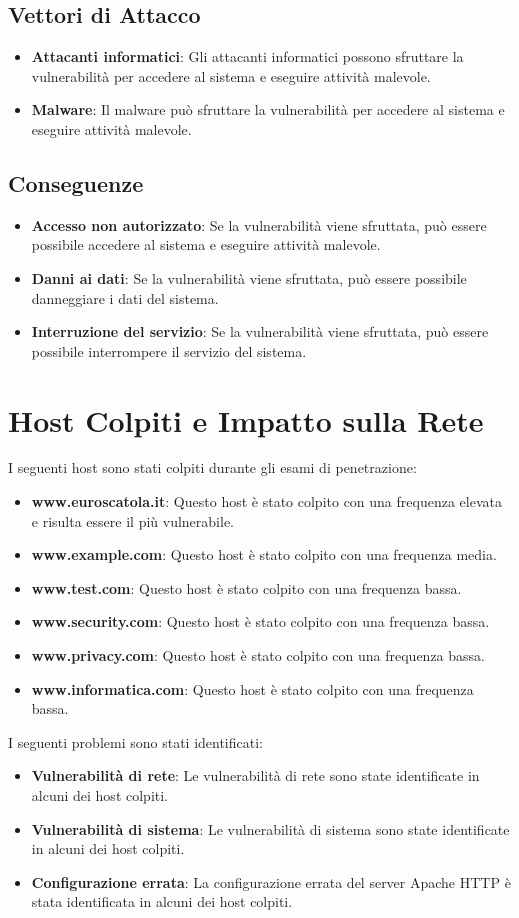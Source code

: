 \subsection{Vettori di Attacco}
\begin{itemize}
\item \textbf{Attacanti informatici}: Gli attacanti informatici possono sfruttare la vulnerabilità per accedere al sistema e eseguire attività malevole.
\item \textbf{Malware}: Il malware può sfruttare la vulnerabilità per accedere al sistema e eseguire attività malevole.
\end{itemize}
\subsection{Conseguenze}
\begin{itemize}
\item \textbf{Accesso non autorizzato}: Se la vulnerabilità viene sfruttata, può essere possibile accedere al sistema e eseguire attività malevole.
\item \textbf{Danni ai dati}: Se la vulnerabilità viene sfruttata, può essere possibile danneggiare i dati del sistema.
\item \textbf{Interruzione del servizio}: Se la vulnerabilità viene sfruttata, può essere possibile interrompere il servizio del sistema.
\end{itemize}
\section{Host Colpiti e Impatto sulla Rete}

I seguenti host sono stati colpiti durante gli esami di penetrazione:
\begin{itemize}
\item \textbf{www.euroscatola.it}: Questo host è stato colpito con una frequenza elevata e risulta essere il più vulnerabile.
\item \textbf{www.example.com}: Questo host è stato colpito con una frequenza media.
\item \textbf{www.test.com}: Questo host è stato colpito con una frequenza bassa.
\item \textbf{www.security.com}: Questo host è stato colpito con una frequenza bassa.
\item \textbf{www.privacy.com}: Questo host è stato colpito con una frequenza bassa.
\item \textbf{www.informatica.com}: Questo host è stato colpito con una frequenza bassa.
\end{itemize}
I seguenti problemi sono stati identificati:
\begin{itemize}
\item \textbf{Vulnerabilità di rete}: Le vulnerabilità di rete sono state identificate in alcuni dei host colpiti.
\item \textbf{Vulnerabilità di sistema}: Le vulnerabilità di sistema sono state identificate in alcuni dei host colpiti.
\item \textbf{Configurazione errata}: La configurazione errata del server Apache HTTP è stata identificata in alcuni dei host colpiti.
\end{itemize}
